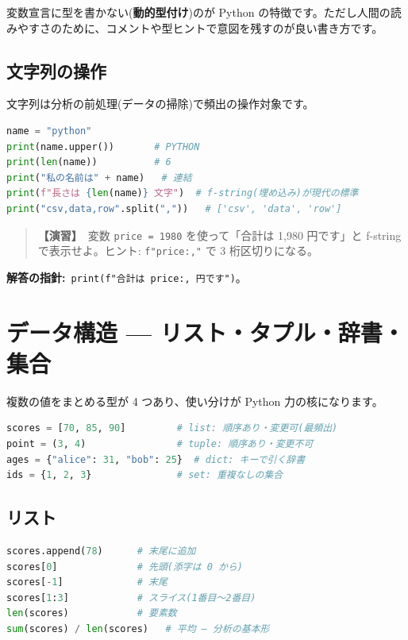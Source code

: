 \documentclass{article}
\begin{document}
変数宣言に型を書かない(\textbf{動的型付け})のが Python の特徴です。ただし人間の読みやすさのために、コメントや型ヒントで意図を残すのが良い書き方です。

\subsection{文字列の操作}

文字列は分析の前処理(データの掃除)で頻出の操作対象です。

\begin{lstlisting}[language=Python]
name = "python"
print(name.upper())       # PYTHON
print(len(name))          # 6
print("私の名前は" + name)   # 連結
print(f"長さは {len(name)} 文字")  # f-string(埋め込み)が現代の標準
print("csv,data,row".split(","))   # ['csv', 'data', 'row']
\end{lstlisting}

\begin{quote}
\textbf{【演習】}\ 変数 \texttt{price = 1980} を使って「合計は 1,980 円です」と f-string で表示せよ。ヒント: \texttt{f"{price:,}"} で 3 桁区切りになる。
\end{quote}

\textbf{解答の指針:}\ \texttt{print(f"合計は {price:,} 円です")}。

\section{データ構造 — リスト・タプル・辞書・集合}

複数の値をまとめる型が 4 つあり、使い分けが Python 力の核になります。

\begin{lstlisting}[language=Python]
scores = [70, 85, 90]         # list: 順序あり・変更可(最頻出)
point = (3, 4)                # tuple: 順序あり・変更不可
ages = {"alice": 31, "bob": 25}  # dict: キーで引く辞書
ids = {1, 2, 3}               # set: 重複なしの集合
\end{lstlisting}

\subsection{リスト}

\begin{lstlisting}[language=Python]
scores.append(78)      # 末尾に追加
scores[0]              # 先頭(添字は 0 から)
scores[-1]             # 末尾
scores[1:3]            # スライス(1番目〜2番目)
len(scores)            # 要素数
sum(scores) / len(scores)   # 平均 — 分析の基本形
\end{lstlisting}
\end{document}
